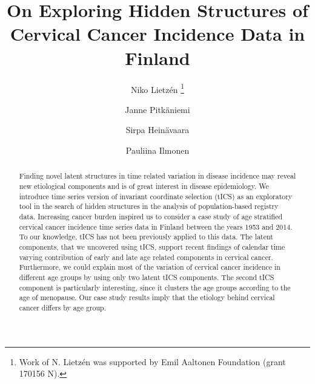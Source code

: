 \documentclass{llncs}
\begin{document}
\title{On Exploring Hidden Structures of \\ Cervical Cancer Incidence Data in Finland}
\author{Niko Lietz\'{e}n \thanks{Work of N. Lietz\'{e}n was supported by Emil Aaltonen Foundation (grant 170156 N).}  \and Janne Pitk{\"a}niemi  \and Sirpa Hein{\"a}vaara  \and Pauliina Ilmonen }





\maketitle




\begin{abstract}
Finding novel latent structures in time related variation in disease incidence  may reveal new etiological components and is of great interest in disease  epidemiology. We introduce  time series version of invariant coordinate selection (tICS) as an exploratory tool in the search of hidden structures in the analysis of population-based registry data.  Increasing cancer burden inspired us to consider  a case study of age stratified cervical cancer incidence time series data in Finland between the years 1953 and 2014. To our knowledge,  tICS  has not been previously applied  to this  data. The latent components, that we uncovered using tICS, support recent findings of calendar time varying contribution of early and late age related components in cervical cancer. 
Furthermore, we could explain most of the variation of cervical cancer incidence in different age groups by using only two latent tICS components. The second tICS component is particularly interesting, since it clusters the age groups according to the age of menopause. Our case study results imply that the etiology behind cervical cancer differs by age group. 
\end{abstract}
\end{document}
